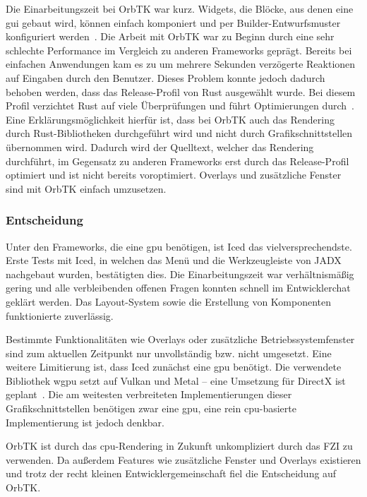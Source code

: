 Die Einarbeitungszeit bei OrbTK war kurz. Widgets, die Blöcke, aus denen eine \gls{gui} gebaut wird, können einfach komponiert und per Builder-Entwurfsmuster konfiguriert werden~\cite{RedoxosOrbtk2015}. Die Arbeit mit OrbTK war zu Beginn durch eine sehr schlechte Performance im Vergleich zu anderen Frameworks geprägt. Bereits bei einfachen Anwendungen kam es zu um mehrere Sekunden verzögerte Reaktionen auf Eingaben durch den Benutzer. Dieses Problem konnte jedoch dadurch behoben werden, dass das Release-Profil von Rust ausgewählt wurde. Bei diesem Profil verzichtet Rust auf viele Überprüfungen und führt Optimierungen durch~\cite{CustomizingBuildsRelease}. Eine Erklärungsmöglichkeit hierfür ist, dass bei OrbTK auch das Rendering durch Rust-Bibliotheken durchgeführt wird und nicht durch Grafikschnittstellen übernommen wird. Dadurch wird der Quelltext, welcher das Rendering durchführt, im Gegensatz zu anderen Frameworks erst durch das Release-Profil optimiert und ist nicht bereits voroptimiert. Overlays und zusätzliche Fenster sind mit OrbTK einfach umzusetzen.

\subsubsection*{Entscheidung}

Unter den Frameworks, die eine \gls{gpu} benötigen, ist Iced das vielversprechendste. Erste Tests mit Iced, in welchen das Menü und die Werkzeugleiste von JADX nachgebaut wurden, bestätigten dies. Die Einarbeitungszeit war verhältnismäßig gering und alle verbleibenden offenen Fragen konnten schnell im Entwicklerchat geklärt werden. Das Layout-System sowie die Erstellung von Komponenten funktionierte zuverlässig.

Bestimmte Funktionalitäten wie Overlays oder zusätzliche Betriebssystemfenster sind zum aktuellen Zeitpunkt nur unvollständig bzw. nicht umgesetzt.
Eine weitere Limitierung ist, dass Iced zunächst eine \gls{gpu} benötigt. Die verwendete Bibliothek wgpu setzt auf Vulkan und Metal -- eine Umsetzung für DirectX ist geplant~\cite{GfxrsWgpu2018}. Die am weitesten verbreiteten Implementierungen dieser Grafikschnittstellen benötigen zwar eine \gls{gpu}, eine rein \gls{cpu}-basierte Implementierung ist jedoch denkbar.

OrbTK ist durch das \gls{cpu}-Rendering in Zukunft unkompliziert durch das FZI zu verwenden. Da außerdem Features wie zusätzliche Fenster und Overlays existieren und trotz der recht kleinen Entwicklergemeinschaft fiel die Entscheidung auf OrbTK.



